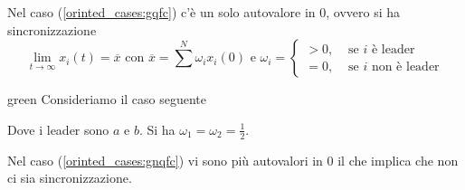 Nel caso (\ref{orinted_cases:gqfc}) c'è un solo autovalore  in $0$, ovvero si ha sincronizzazione
\begin{equation}
    \lim_{t \to \infty} x_i(t) = \overline{x} \text{ con } \overline{x} = \sum^N \omega_i x_i(0) \text{ e }
    \omega_i = \begin{cases}
    >0, & \text{ se $i$ è leader} \\
    =0, & \text{ se $i$ non è leader}
    \end{cases}
\end{equation}
\begin{mybox}[breakable]{green}{}
Consideriamo il caso seguente \\
\begin{center}
\end{center}
Dove i leader sono $a$ e $b$. Si ha $\omega_1 = \omega_2 = \frac{1}{2}$.
\end{mybox}
Nel caso (\ref{orinted_cases:gnqfc}) vi sono più autovalori in 0 il che implica che non ci sia sincronizzazione.
